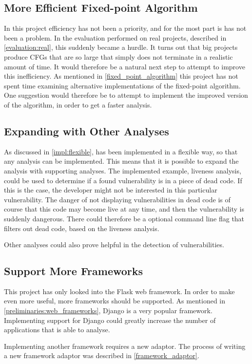 \subsection{More Efficient Fixed-point Algorithm}
In this project efficiency has not been a priority, and for the most part is has not been a problem.
In the evaluation performed on real projects, described in \cref{evaluation:real}, this suddenly became a hurdle.
It turns out that big projects produce CFGs that are so large that \pyt{} simply does not terminate in a realistic amount of time.
It would therefore be a natural next step to attempt to improve this inefficiency.
As mentioned in \cref{fixed_point_algorithm} this project has not spent time examining alternative implementations of the fixed-point algorithm.
One suggestion would therefore be to attempt to implement the improved version of the algorithm, in order to get a faster analysis.

\subsection{Expanding \pyt{} with Other Analyses}
As discussed in \cref{impl:flexible}, \pyt{} has been implemented in a flexible way, so that any analysis can be implemented.
This means that it is possible to expand the analysis with supporting analyses.
The implemented example, liveness analysis, could be used to determine if a found vulnerability is in a piece of dead code.
If this is the case, the developer might not be interested in this particular vulnerability.
The danger of not displaying vulnerabilities in dead code is of course that this code may become live at any time, and then the vulnerability is suddenly dangerous.
There could therefore be a optional command line flag that filters out dead code, based on the liveness analysis.

Other analyses could also prove helpful in the detection of vulnerabilities.

\subsection{Support More Frameworks}
This project has only looked into the Flask web framework.
In order to make \pyt{} even more useful, more frameworks should be supported.
As mentioned in \cref{preliminaries:web_frameworks}, Django is a very popular framework.
Implementing support for Django could greatly increase the number of applications that \pyt{} is able to analyse.

Implementing another framework requires a new adaptor.
The process of writing a new framework adaptor was described in \cref{framework_adaptor}.
